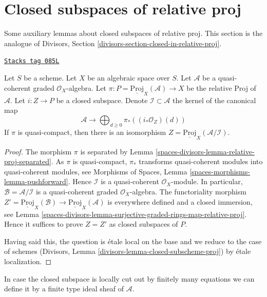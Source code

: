 \section{Closed subspaces of relative proj}
\label{spaces-divisors-section-closed-in-relative-proj}
Some auxiliary lemmas about closed subspaces of relative proj.
This section is the analogue of
Divisors, Section \ref{divisors-section-closed-in-relative-proj}.

\begin{lemma}
\label{spaces-divisors-lemma-closed-subscheme-proj}
\href{https://stacks.math.columbia.edu/tag/085L}{\texttt{Stacks tag 085L}}

Let $S$ be a scheme. Let $X$ be an algebraic space over $S$.
Let $\mathcal{A}$ be a quasi-coherent graded $\mathcal{O}_X$-algebra. Let
$\pi : P = \underline{\text{Proj}}_X(\mathcal{A}) \to X$ be the relative
Proj of $\mathcal{A}$. Let $i : Z \to P$ be a closed subspace. Denote
$\mathcal{I} \subset \mathcal{A}$ the kernel of the canonical map
$$
\mathcal{A}
\longrightarrow
\bigoplus\nolimits_{d \geq 0} \pi_*\left((i_*\mathcal{O}_Z)(d)\right)
$$
If $\pi$ is quasi-compact, then there is an isomorphism
$Z = \underline{\text{Proj}}_X(\mathcal{A}/\mathcal{I})$.
\end{lemma}

\begin{proof}
The morphism $\pi$ is separated by
Lemma \ref{spaces-divisors-lemma-relative-proj-separated}.
As $\pi$ is quasi-compact, $\pi_*$ transforms quasi-coherent modules
into quasi-coherent modules, see
Morphisms of Spaces, Lemma \ref{spaces-morphisms-lemma-pushforward}.
Hence $\mathcal{I}$ is a quasi-coherent $\mathcal{O}_X$-module.
In particular, $\mathcal{B} = \mathcal{A}/\mathcal{I}$ is a
quasi-coherent graded $\mathcal{O}_X$-algebra. The functoriality
morphism $Z' = \underline{\text{Proj}}_X(\mathcal{B}) \to
\underline{\text{Proj}}_X(\mathcal{A})$ is everywhere defined and
a closed immersion, see Lemma
\ref{spaces-divisors-lemma-surjective-graded-rings-map-relative-proj}.
Hence it suffices to prove $Z = Z'$ as closed subspaces of $P$.

\medskip\noindent
Having said this, the question is \'etale local on the base and we
reduce to the case of schemes
(Divisors, Lemma \ref{divisors-lemma-closed-subscheme-proj})
by \'etale localization.
\end{proof}

In case the closed subspace is locally cut out by finitely many
equations we can define it by a finite type ideal sheaf of
$\mathcal{A}$.

